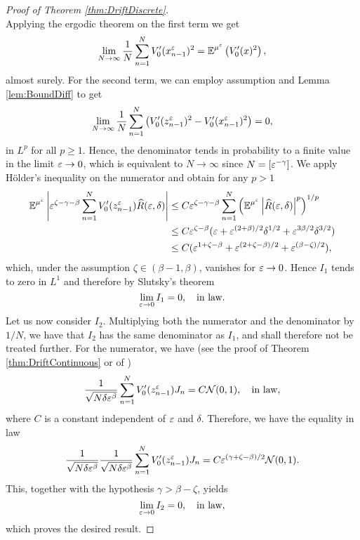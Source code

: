 \documentclass[10pt]{article}
\begin{document}
\begin{proof}[Proof of Theorem \ref{thm:DriftDiscrete}]
\begin{equation}
	\end{equation} 
	Applying the ergodic theorem on the first term we get
	\begin{equation}
		\lim_{N \to \infty} \frac1N \sum_{n=1}^{N} V_0'(x^\varepsilon_{n-1})^2 = \operatorname{\mathbb{E}}^{\mu^\varepsilon} \left(V_0'(x)^2\right),
	\end{equation}
	almost surely. For the second term, we can employ assumption  and Lemma \ref{lem:BoundDiff} to get
	\begin{equation}
		\lim_{N\to\infty} \frac1N \sum_{n=1}^{N} \left(V_0'(z^\varepsilon_{n-1})^2 - V_0'(x^\varepsilon_{n-1})^2\right) = 0,
	\end{equation}
	in $L^p$ for all $p \geq 1$. Hence, the denominator tends in probability to a finite value in the limit $\varepsilon \to 0$, which is equivalent to $N \to \infty$ since $N = [\varepsilon^{-\gamma}]$. We apply Hölder's inequality on the numerator and obtain for any $p > 1$
	\begin{equation}
	\begin{aligned}
		\operatorname{\mathbb{E}}^{\mu^\varepsilon} \left\lvert\varepsilon^{\zeta-\gamma-\beta} \sum_{n=1}^{N}V_0'(z^\varepsilon_{n-1})\widehat R(\varepsilon, \delta)\right\rvert &\leq C \varepsilon^{\zeta-\gamma-\beta}\sum_{n=1}^{N} \left(\operatorname{\mathbb{E}}^{\mu^\varepsilon} \left\lvert\widehat R(\varepsilon, \delta)\right\rvert^p\right)^{1/p}\\
		&\leq C \varepsilon^{\zeta-\beta}(\varepsilon +  \varepsilon^{(2+\beta)/2}\delta^{1/2} + \varepsilon^{3\beta/2}\delta^{3/2})\\
		&\leq C (\varepsilon^{1+\zeta-\beta} +  \varepsilon^{(2+\zeta-\beta)/2} + \varepsilon^{(\beta-\zeta)/2}),
	\end{aligned}
	\end{equation}
	which, under the assumption $\zeta \in (\beta-1, \beta)$, vanishes for $\varepsilon \to 0$. Hence $I_1$ tends to zero in $L^1$ and therefore by Slutsky's theorem
	\begin{equation}
		\lim_{\varepsilon \to 0} I_1 = 0, \quad \text{in law}.
	\end{equation}
	Let us now consider $I_2$. Multiplying both the numerator and the denominator by $1/N$, we have that $I_2$ has the same denominator as $I_1$, and shall therefore not be treated further. For the numerator, we have (see the proof of Theorem \ref{thm:DriftContinuous} or of \cite[Theorem 3.5]{PaS07})
	\begin{equation}
		\frac{1}{\sqrt{N\delta\varepsilon^\beta}}\sum_{n=1}^{N}V_0'(z^\varepsilon_{n-1})J_n = C\mathcal N(0, 1), \quad \text{in law},
	\end{equation}
	where $C$ is a constant independent of $\varepsilon$ and $\delta$. Therefore, we have the equality in law
	\begin{equation}
		\frac{1}{\sqrt{N\delta \varepsilon^\beta}} \frac{1}{\sqrt{N\delta\varepsilon^\beta}}\sum_{n=1}^{N}V_0'(z^\varepsilon_{n-1})J_n = C\varepsilon^{(\gamma +\zeta - \beta)/2} \mathcal N(0, 1).
	\end{equation} 
	This, together with the hypothesis $\gamma > \beta - \zeta$, yields
	\begin{equation}
		\lim_{\varepsilon \to 0} I_2 = 0, \quad \text{in law},
	\end{equation}
	which proves the desired result.
\end{proof}
\end{document}
